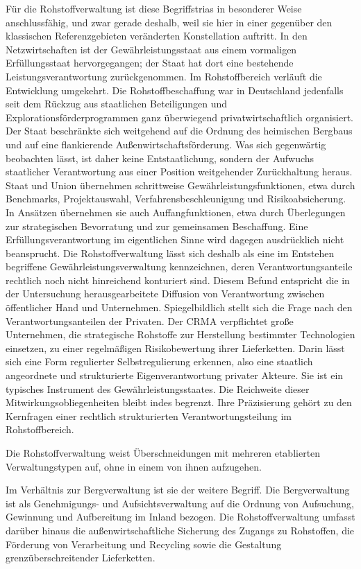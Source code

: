 \documentclass[12pt,a4paper,oneside]{book} %
\begin{document}
{	Für die Rohstoffverwaltung ist diese Begriffstrias in besonderer Weise anschlussfähig, und zwar gerade deshalb, weil sie hier in einer gegenüber den klassischen Referenzgebieten veränderten Konstellation auftritt. In den Netzwirtschaften ist der Gewährleistungsstaat aus einem vormaligen Erfüllungsstaat hervorgegangen; der Staat hat dort eine bestehende Leistungsverantwortung zurückgenommen. Im Rohstoffbereich verläuft die Entwicklung umgekehrt. Die Rohstoffbeschaffung war in Deutschland jedenfalls seit dem Rückzug aus staatlichen Beteiligungen und Explorationsförderprogrammen ganz überwiegend privatwirtschaftlich organisiert. Der Staat beschränkte sich weitgehend auf die Ordnung des heimischen Bergbaus und auf eine flankierende Außenwirtschaftsförderung. Was sich gegenwärtig beobachten lässt, ist daher keine Entstaatlichung, sondern der Aufwuchs staatlicher Verantwortung aus einer Position weitgehender Zurückhaltung heraus. Staat und Union übernehmen schrittweise Gewährleistungsfunktionen, etwa durch Benchmarks, Projektauswahl, Verfahrensbeschleunigung und Risikoabsicherung. In Ansätzen übernehmen sie auch Auffangfunktionen, etwa durch Überlegungen zur strategischen Bevorratung und zur gemeinsamen Beschaffung. Eine Erfüllungsverantwortung im eigentlichen Sinne wird dagegen ausdrücklich nicht beansprucht. Die Rohstoffverwaltung lässt sich deshalb als eine im Entstehen begriffene Gewährleistungsverwaltung kennzeichnen, deren Verantwortungsanteile rechtlich noch nicht hinreichend konturiert sind. Diesem Befund entspricht die in der Untersuchung herausgearbeitete Diffusion von Verantwortung zwischen öffentlicher Hand und Unternehmen. Spiegelbildlich stellt sich die Frage nach den Verantwortungsanteilen der Privaten. Der CRMA verpflichtet große Unternehmen, die strategische Rohstoffe zur Herstellung bestimmter Technologien einsetzen, zu einer regelmäßigen Risikobewertung ihrer Lieferketten. Darin lässt sich eine Form regulierter Selbstregulierung erkennen, also eine staatlich angeordnete und strukturierte Eigenverantwortung privater Akteure. Sie ist ein typisches Instrument des Gewährleistungsstaates. Die Reichweite dieser Mitwirkungsobliegenheiten bleibt indes begrenzt. Ihre Präzisierung gehört zu den Kernfragen einer rechtlich strukturierten Verantwortungsteilung im Rohstoffbereich.
	
	Die Rohstoffverwaltung weist Überschneidungen mit mehreren etablierten Verwaltungstypen auf, ohne in einem von ihnen aufzugehen.
	
	Im Verhältnis zur Bergverwaltung ist sie der weitere Begriff. Die Bergverwaltung ist als Genehmigungs- und Aufsichtsverwaltung auf die Ordnung von Aufsuchung, Gewinnung und Aufbereitung im Inland bezogen. Die Rohstoffverwaltung umfasst darüber hinaus die außenwirtschaftliche Sicherung des Zugangs zu Rohstoffen, die Förderung von Verarbeitung und Recycling sowie die Gestaltung grenzüberschreitender Lieferketten.
	
}
\end{document}

